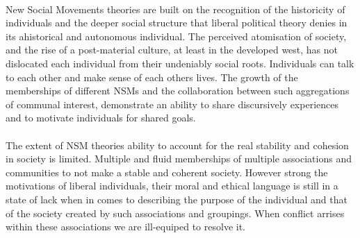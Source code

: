 \documentclass[12pt,a4paper,titlepage]{article}
\begin{document}
\paragraph{}New Social Movements theories are built on the recognition of the historicity of individuals and the deeper social structure that liberal political theory denies in its ahistorical and autonomous individual. The perceived atomisation of society, and the rise of a post-material culture, at least in the developed west, has not dislocated each individual from their undeniably social roots. Individuals can talk to each other and make sense of each others lives. The growth of the memberships of different NSMs and the collaboration between such aggregations of communal interest, demonstrate an ability to share discursively experiences and to motivate individuals for shared goals.

\paragraph{}The extent of NSM theories ability to account for the real stability and cohesion in society is limited. Multiple and fluid memberships of multiple associations and communities to not make a stable and coherent society. However strong the motivations of liberal individuals, their moral and ethical language is still in a state of lack when in comes to describing the purpose of the individual and that of the society created by such associations and groupings. When conflict arrises within these associations we are ill-equiped to resolve it.
\end{document}
